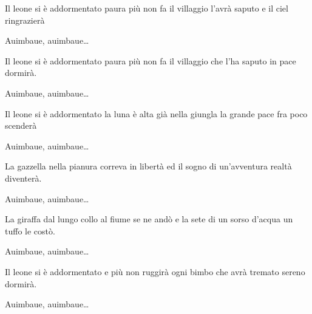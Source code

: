 
\beginverse

Il leone si è addormentato
paura più non fa
il villaggio l'avrà saputo
e il ciel ringrazierà

\endverse

\beginchorus

Auimbaue, auimbaue\dots

\endchorus

\chordsoff

\beginverse

Il leone si è addormentato
paura più non fa
il villaggio che l'ha saputo
in pace dormirà.

\endverse

\beginchorus

Auimbaue, auimbaue\dots

\endchorus

\beginverse

Il leone si è addormentato
la luna è alta già
nella giungla la grande pace
fra poco scenderà

\endverse

\beginchorus

Auimbaue, auimbaue\dots

\endchorus

\beginverse

La gazzella nella pianura
correva in libertà
ed il sogno di un'avventura
realtà diventerà.

\endverse

\beginchorus

Auimbaue, auimbaue\dots

\endchorus

\beginverse

La giraffa dal lungo collo
al fiume se ne andò
e la sete di un sorso d'acqua
un tuffo le costò.

\endverse

\beginchorus

Auimbaue, auimbaue\dots

\endchorus

\beginverse

Il leone si è addormentato
e più non ruggirà
ogni bimbo
che avrà tremato
sereno dormirà.

\endverse

\beginchorus

Auimbaue, auimbaue\dots

\endchorus

\endsong

